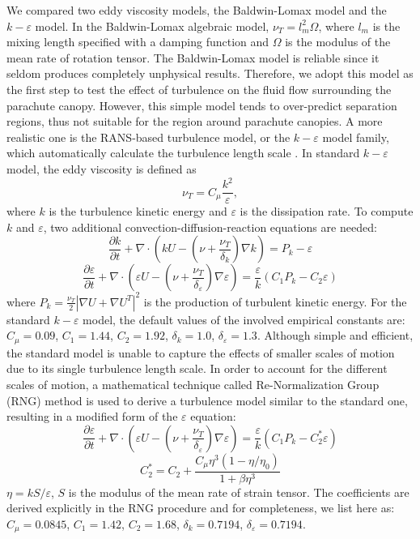 We compared two eddy viscosity models, the Baldwin-Lomax model and the
$k-\varepsilon$ model.  In the Baldwin-Lomax \cite{Bldwin78} algebraic model,
$\nu_T = l_m^2\Omega$, where $l_m$ is the mixing length specified with a damping
function and $\Omega$ is the modulus of the mean rate of rotation tensor.  The
Baldwin-Lomax model is reliable since it seldom produces completely unphysical
results. Therefore, we adopt this model as the first step to test the effect of
turbulence on the fluid flow surrounding the parachute canopy. However, this
simple model tends to over-predict separation regions, thus not suitable for the
region around parachute canopies. A more realistic one is the RANS-based
turbulence model, or the $k-\varepsilon$ model family, which automatically
calculate the turbulence length scale \cite{wilcox1998turbulence}.  In standard
$k-\varepsilon$ model, the eddy viscosity is defined as \begin{equation} \nu_T =
C_{\mu}\frac{k^2}{\varepsilon}, \label{eq:nuT} \end{equation} where $k$ is the
turbulence kinetic energy and $\varepsilon$ is the dissipation rate. To compute
$k$ and $\varepsilon$, two additional convection-diffusion-reaction equations
are needed: \begin{equation} \frac{\partial k}{\partial
t}+\nabla\cdot(kU-(\nu+\frac{\nu_T}{\delta_k})\nabla k) =P_k - \varepsilon
\label{eq:k} \end{equation} \begin{equation} \frac{\partial
\varepsilon}{\partial t}+\nabla\cdot(\varepsilon U
-(\nu+\frac{\nu_T}{\delta_\varepsilon})\nabla \varepsilon)
=\frac{\varepsilon}{k}(C_1P_k-C_2\varepsilon) \label{eq:eps} \end{equation}
where $P_k = \frac{\nu_T}{2}|\nabla U + \nabla U^T|^2$ is the production of
turbulent kinetic energy. For the standard $k-\varepsilon$ model, the default
values of the involved empirical constants are: $C_\mu = 0.09$, $C_1 = 1.44$,
$C_2=1.92$, $\delta_k=1.0$, $\delta_{\varepsilon}=1.3$.  Although simple and
efficient, the standard model is unable to capture the effects of smaller scales
of motion due to its single turbulence length scale.  In order to account for
the different scales of motion, a mathematical technique called Re-Normalization
Group (RNG) method \cite{yakhot1992renormalization} is used to derive a
turbulence model similar to the standard one, resulting in a modified form of
the $\varepsilon$ equation: \begin{equation} \frac{\partial
\varepsilon}{\partial t}+\nabla\cdot(\varepsilon U
-(\nu+\frac{\nu_T}{\delta_\varepsilon})\nabla \varepsilon)
=\frac{\varepsilon}{k}(C_1P_k-C^*_2\varepsilon) \label{eq:RNG} \end{equation}
\begin{equation} C^*_2=C_2+\frac{C_{\mu}\eta^3(1-\eta/\eta_0)}{1+\beta\eta^3}
\end{equation} $\eta = kS/\varepsilon$, $S$ is the modulus of the mean rate of
strain tensor.  The coefficients are derived explicitly in the RNG procedure and
for completeness, we list here as: $C_\mu = 0.0845$, $C_1 = 1.42$, $C_2=1.68$,
$\delta_k=0.7194$, $\delta_{\varepsilon}=0.7194$.

